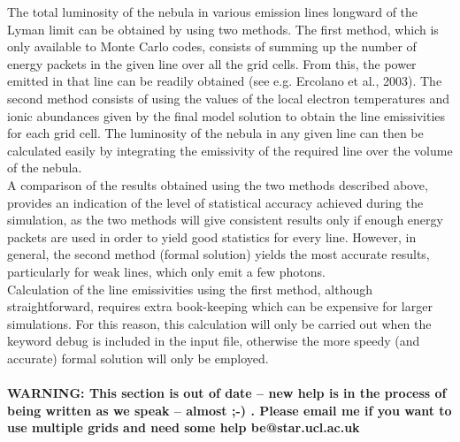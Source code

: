 \documentclass[11pt]{article}
\begin{document}
   The total luminosity of the nebula in various emission lines longward of the 
   Lyman limit can be obtained by using two methods. The first method, which is 
   only available to Monte Carlo codes, consists of summing up the number of energy
   packets in the given line over all the grid cells. From this, the power 
   emitted in that line can be readily obtained (see e.g. Ercolano et al., 2003). 
   The second method consists of using the values of the local electron temperatures
   and ionic abundances given by the final model solution to obtain the line 
   emissivities for each grid cell. The luminosity of the nebula in any given line 
   can then be calculated easily by integrating the emissivity of the required line
   over the volume of the nebula. \\
   A comparison of the results obtained using the two methods described above, 
   provides an indication of the level of statistical accuracy achieved during the 
   simulation, as the two methods will give consistent results only if enough 
   energy packets are used in order to yield good statistics for every line. 
   However, in general, the second method (formal solution) yields the most 
   accurate results, particularly for weak lines, which only emit a few photons.\\
   Calculation of the line emissivities using the first method, although 
   straightforward, requires extra book-keeping which can be expensive for larger 
   simulations. For this reason, this calculation will only be carried out when the
   keyword debug is included in the input file, otherwise the more speedy 
   (and accurate) formal solution will only be employed. \\

\\

   {\bf WARNING: This section is out of date -- new help is in the process of being 
   written as we speak -- almost ;-) . Please email me if you want to use multiple grids 
   and need some help be@star.ucl.ac.uk}\\
   
\end{document}
